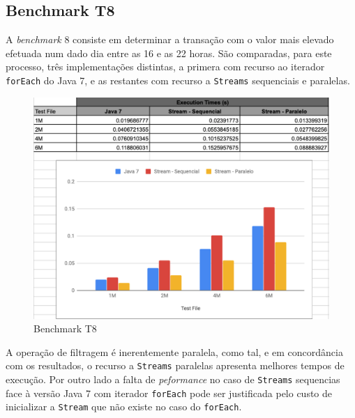 \documentclass{article}
\begin{document}
\subsection{Benchmark T8}
A \textit{benchmark} 8 consiste em determinar a transação com o valor mais elevado efetuada num dado dia entre as 16 e as 22 horas.
São comparadas, para este processo, três implementações distintas, a primera com recurso ao iterador \texttt{forEach} do Java 7, e as restantes com recurso a \texttt{Streams} sequenciais e paralelas.
\begin{figure}[H]
    \centering
    \includegraphics[width=15cm]{Pictures/T8.png}
    \caption{Benchmark T8}
\end{figure}
A operação de filtragem é inerentemente paralela, como tal, e em concordância com os resultados, o recurso a \texttt{Streams} paralelas apresenta melhores tempos de execução.
Por outro lado a falta de \textit{peformance} no caso de \texttt{Streams} sequencias face à versão Java 7 com iterador \texttt{forEach} pode ser justificada pelo custo de 
inicializar a \texttt{Stream} que não existe no caso do \texttt{forEach}.

\newpage
\end{document}
